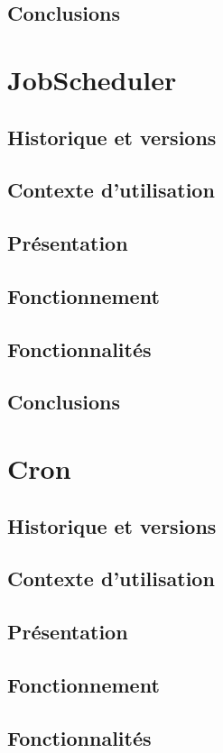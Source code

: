 \documentclass[12pt]{article}
\begin{document}
\subsection{Conclusions}

\section{JobScheduler}
\subsection{Historique et versions}
\subsection{Contexte d'utilisation}
\subsection{Présentation}
\subsection{Fonctionnement}
\subsection{Fonctionnalités}
\subsection{Conclusions}

\section{Cron}
\subsection{Historique et versions}
\subsection{Contexte d'utilisation}
\subsection{Présentation}
\subsection{Fonctionnement}
\subsection{Fonctionnalités}
\end{document}
